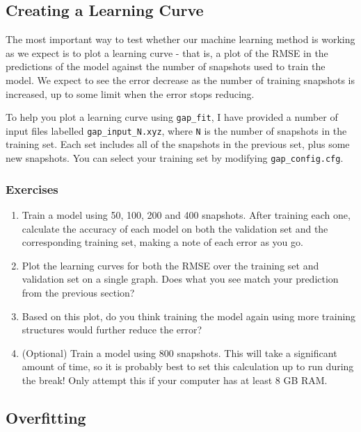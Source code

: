 \documentclass{article}
\begin{document}
\subsection{Creating a Learning Curve}

The most important way to test whether our machine learning method is working as we expect is to plot a learning curve - that is, a plot of the RMSE in the predictions of the model against the number of snapshots used to train the model. We expect to see the error decrease as the number of training snapshots is increased, up to some limit when the error stops reducing.

To help you plot a learning curve using \verb|gap_fit|, I have provided a number of input files labelled \verb|gap_input_N.xyz|, where \verb|N| is the number of snapshots in the training set. Each set includes all of the snapshots in the previous set, plus some new snapshots. You can select your training set by modifying \verb|gap_config.cfg|.

\subsubsection*{Exercises}

\begin{enumerate}

\item Train a model using 50, 100, 200 and 400 snapshots. After training each one, calculate the accuracy of each model on both the validation set and the corresponding training set, making a note of each error as you go.
\item Plot the learning curves for both the RMSE over the training set and validation set on a single graph. Does what you see match your prediction from the previous section?
\item Based on this plot, do you think training the model again using more training structures would further reduce the error?
\item (Optional) Train a model using 800 snapshots. This will take a significant amount of time, so it is probably best to set this calculation up to run during the break! Only attempt this if your computer has at least 8 GB RAM.

\end{enumerate}

\subsection{Overfitting}
\end{document}
